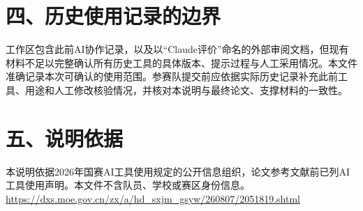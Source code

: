 \section*{四、历史使用记录的边界}
工作区包含此前AI协作记录，以及以“Claude评价”命名的外部审阅文档，但现有材料不足以完整确认所有历史工具的具体版本、提示过程与人工采用情况。本文件准确记录本次可确认的使用范围。参赛队提交前应依据实际历史记录补充此前工具、用途和人工修改核验情况，并核对本说明与最终论文、支撑材料的一致性。

\section*{五、说明依据}
本说明依据2026年国赛AI工具使用规定的公开信息组织，论文参考文献前已列AI工具使用声明。本文件不含队员、学校或赛区身份信息。
\noindent\url{https://dxs.moe.gov.cn/zx/a/hd_sxjm_gsyw/260807/2051819.shtml}

